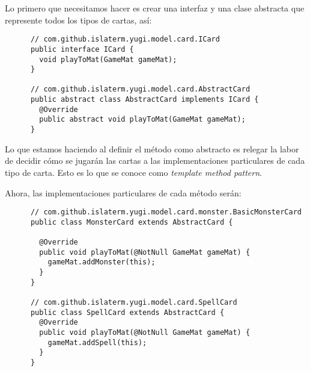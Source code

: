 \begin{Answer}[ref={ex:template-1}]
    Lo primero que necesitamos hacer es crear una interfaz y una clase abstracta que 
    represente todos los tipos de cartas, así:
    \begin{verbatim}
      // com.github.islaterm.yugi.model.card.ICard
      public interface ICard {
        void playToMat(GameMat gameMat);
      }

      // com.github.islaterm.yugi.model.card.AbstractCard
      public abstract class AbstractCard implements ICard {
        @Override
        public abstract void playToMat(GameMat gameMat);
      }
    \end{verbatim}

    Lo que estamos haciendo al definir el método como abstracto es relegar la labor de 
    decidir cómo se jugarán las cartas a las implementaciones particulares de cada tipo de
    carta.
    Esto es lo que se conoce como \textit{template method pattern}.

    Ahora, las implementaciones particulares de cada método serán:
    \begin{verbatim}
      // com.github.islaterm.yugi.model.card.monster.BasicMonsterCard
      public class MonsterCard extends AbstractCard {

        @Override
        public void playToMat(@NotNull GameMat gameMat) {
          gameMat.addMonster(this);
        }
      }

      // com.github.islaterm.yugi.model.card.SpellCard
      public class SpellCard extends AbstractCard {
        @Override
        public void playToMat(@NotNull GameMat gameMat) {
          gameMat.addSpell(this);
        }
      }
    \end{verbatim}
  \end{Answer}
  
